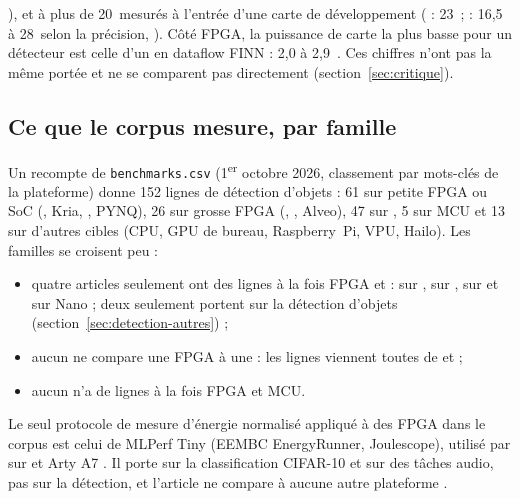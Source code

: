 \citealp[Table~4]{arxiv-2502.15737-performance-analysis-you-only-look}), et à plus de
20\, mesurés à l'entrée d'une carte de développement ( : 23\, ;  : 16,5
à 28\, selon la précision, \citealp[Table~1]{arxiv-2304.11580-framework-benchmarking-real-time-embedded}).
Côté FPGA, la puissance de carte la plus basse pour un détecteur est celle d'un 
 en dataflow FINN : 2,0 à 2,9\,
\citep[§V]{arxiv-2609.24757-npu-accelerator-quantized-real-time}\pp. Ces chiffres n'ont
pas la même portée et ne se comparent pas directement (section~\ref{sec:critique}).

\subsection{Ce que le corpus mesure, par famille}

Un recompte de \texttt{benchmarks.csv} (1\textsuperscript{er} octobre 2026, classement par
mots-clés de la plateforme) donne 152 lignes de détection d'objets : 61 sur petite FPGA ou
SoC (, Kria, , PYNQ), 26 sur grosse FPGA (, , Alveo), 47 sur ,
5 sur MCU et 13 sur d'autres cibles (CPU, GPU de bureau, Raspberry~Pi, VPU, Hailo). Les
familles se croisent peu :
\begin{itemize}
  \item quatre articles seulement ont des lignes à la fois FPGA et  :  sur 
    \citep{arxiv-1909.09709-skynet-hardware-efficient-method-object}\pp,
    \citet{arxiv-2304.11580-framework-benchmarking-real-time-embedded} sur ,
    \citet{arxiv-2407.17647-energy-efficient-artefact-detection-accelerator} sur 
    et \citet{2024-aggarwal-chameleon-dual-memory-replay-online} sur Nano ; deux seulement
    portent sur la détection d'objets (section~\ref{sec:detection-autres}) ;
  \item aucun ne compare une FPGA à une  : les lignes  viennent toutes de
    \citet{arxiv-2502.15737-performance-analysis-you-only-look} et
    \citet{arxiv-2409.16808-comprehensive-evaluation-deep-learning-object}\pp ;
  \item aucun n'a de lignes à la fois FPGA et MCU.
\end{itemize}
Le seul protocole de mesure d'énergie normalisé appliqué à des FPGA dans le corpus est celui
de MLPerf Tiny (EEMBC EnergyRunner, Joulescope), utilisé par
\citet{arxiv-2206.11791-open-source-fpga-ml-codesign}\pp{} sur  et Arty A7
. Il porte sur la classification CIFAR-10 et sur des tâches audio, pas sur la
détection, et l'article ne compare à aucune autre plateforme .

